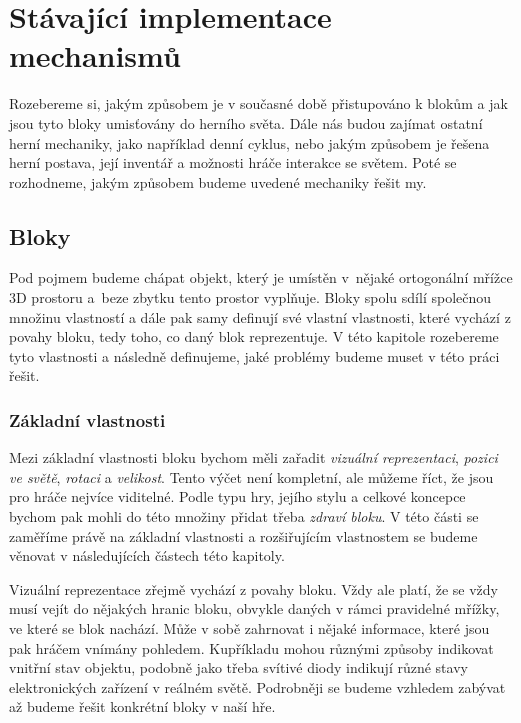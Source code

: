 

\section{Stávající implementace mechanismů}

Rozebereme si, jakým způsobem je v současné době přistupováno k blokům a jak jsou tyto bloky umisťovány do herního světa. Dále nás budou zajímat ostatní herní mechaniky, jako například denní cyklus, nebo jakým způsobem je řešena herní postava, její inventář a možnosti hráče interakce se světem. Poté se rozhodneme, jakým způsobem budeme uvedené mechaniky řešit my.

\subsection{Bloky}
\label{subsec:blocks}

Pod pojmem  budeme chápat objekt, který je umístěn v~nějaké ortogonální mřížce 3D prostoru a~beze zbytku tento prostor vyplňuje. Bloky spolu sdílí společnou množinu vlastností a dále pak samy definují své vlastní vlastnosti, které vychází z povahy bloku, tedy toho, co daný blok reprezentuje. V této kapitole rozebereme tyto vlastnosti a následně definujeme, jaké problémy budeme muset v této práci řešit.


\subsubsection{Základní vlastnosti}

Mezi základní vlastnosti bloku bychom měli zařadit \textit{vizuální reprezentaci}, \textit{pozici ve světě}, \textit{rotaci} a \textit{velikost}. Tento výčet není kompletní, ale můžeme říct, že jsou pro hráče nejvíce viditelné. Podle typu hry, jejího stylu a celkové koncepce bychom pak mohli do této množiny přidat třeba \textit{zdraví bloku}. V této části se zaměříme právě na základní vlastnosti a rozšiřujícím vlastnostem se budeme věnovat v následujících částech této kapitoly.

Vizuální reprezentace zřejmě vychází z povahy bloku. Vždy ale platí, že se vždy musí vejít do nějakých hranic bloku, obvykle daných v rámci pravidelné mřížky, ve které se blok nachází. Může v sobě zahrnovat i nějaké informace, které jsou pak hráčem vnímány pohledem. Kupříkladu mohou různými způsoby indikovat vnitřní stav objektu, podobně jako třeba svítivé diody indikují různé stavy elektronických zařízení v reálném světě. Podrobněji se budeme vzhledem zabývat až budeme řešit konkrétní bloky v naší hře.

